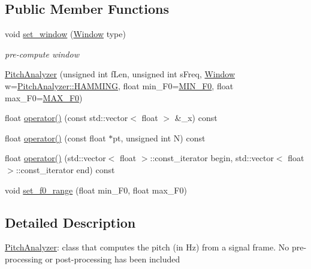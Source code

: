 \subsection*{Public Member Functions}
\begin{DoxyCompactItemize}
\item 
void \hyperlink{classupc_1_1PitchAnalyzer_a96cc042a650825b25ca39c41beebd0db}{set\+\_\+window} (\hyperlink{classupc_1_1PitchAnalyzer_ab82b7694d6bc72839e5be6e526be81b6}{Window} type)
\begin{DoxyCompactList}\small\item\em pre-\/compute window \end{DoxyCompactList}\item 
\hyperlink{classupc_1_1PitchAnalyzer_ae7cfb918feadd7d56f5736e4ef600c06}{Pitch\+Analyzer} (unsigned int f\+Len, unsigned int s\+Freq, \hyperlink{classupc_1_1PitchAnalyzer_ab82b7694d6bc72839e5be6e526be81b6}{Window} w=\hyperlink{classupc_1_1PitchAnalyzer_ab82b7694d6bc72839e5be6e526be81b6a20e793e736a503aacbed0294970a9b33}{Pitch\+Analyzer\+::\+H\+A\+M\+M\+I\+NG}, float min\+\_\+\+F0=\hyperlink{namespaceupc_ae8ed4ce6dc2c05dfc1aa6432db41e1ae}{M\+I\+N\+\_\+\+F0}, float max\+\_\+\+F0=\hyperlink{namespaceupc_ab69be42753266b6e1a0deaa8eba56a19}{M\+A\+X\+\_\+\+F0})
\item 
float \hyperlink{classupc_1_1PitchAnalyzer_a96e4ab38ac616924ac464d77481dfc84}{operator()} (const std\+::vector$<$ float $>$ \&\+\_\+x) const
\item 
float \hyperlink{classupc_1_1PitchAnalyzer_ac4fe50035ebbb1602ab9f4c90755ba0a}{operator()} (const float $\ast$pt, unsigned int N) const
\item 
float \hyperlink{classupc_1_1PitchAnalyzer_a6ae2aaad64d2768c7869f01d25e9d5e6}{operator()} (std\+::vector$<$ float $>$\+::const\+\_\+iterator begin, std\+::vector$<$ float $>$\+::const\+\_\+iterator end) const
\item 
void \hyperlink{classupc_1_1PitchAnalyzer_ac33887654b62b3f90c3de231ec187d94}{set\+\_\+f0\+\_\+range} (float min\+\_\+\+F0, float max\+\_\+\+F0)
\end{DoxyCompactItemize}


\subsection{Detailed Description}
\hyperlink{classupc_1_1PitchAnalyzer}{Pitch\+Analyzer}\+: class that computes the pitch (in Hz) from a signal frame. No pre-\/processing or post-\/processing has been included 


